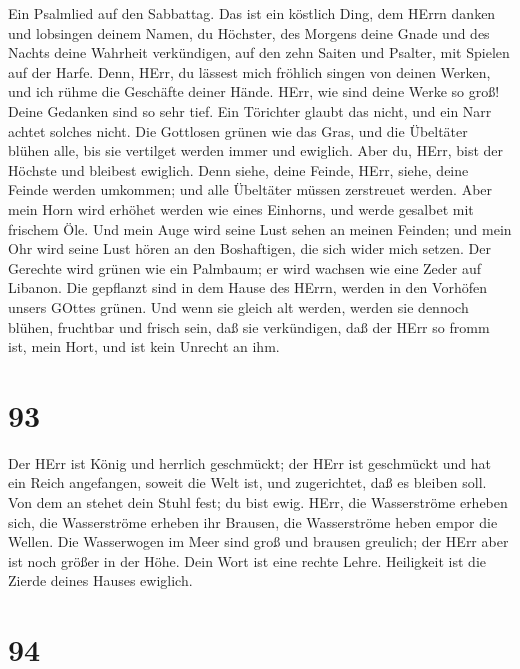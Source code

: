  Ein Psalmlied auf den Sabbattag.  Das ist ein
köstlich Ding, dem HErrn danken und lobsingen deinem Namen, du Höchster,
 des Morgens deine Gnade und des Nachts deine Wahrheit
verkündigen,  auf den zehn Saiten und Psalter, mit Spielen
auf der Harfe.  Denn, HErr, du lässest mich fröhlich singen
von deinen Werken, und ich rühme die Geschäfte deiner Hände.
 HErr, wie sind deine Werke so groß! Deine Gedanken sind so
sehr tief.  Ein Törichter glaubt das nicht, und ein Narr
achtet solches nicht.  Die Gottlosen grünen wie das Gras,
und die Übeltäter blühen alle, bis sie vertilget werden immer und
ewiglich.  Aber du, HErr, bist der Höchste und bleibest
ewiglich.  Denn siehe, deine Feinde, HErr, siehe, deine
Feinde werden umkommen; und alle Übeltäter müssen zerstreuet werden.
 Aber mein Horn wird erhöhet werden wie eines Einhorns, und
werde gesalbet mit frischem Öle.  Und mein Auge wird seine
Lust sehen an meinen Feinden; und mein Ohr wird seine Lust hören an den
Boshaftigen, die sich wider mich setzen.  Der Gerechte wird
grünen wie ein Palmbaum; er wird wachsen wie eine Zeder auf Libanon.
 Die gepflanzt sind in dem Hause des HErrn, werden in den
Vorhöfen unsers GOttes grünen.  Und wenn sie gleich alt
werden, werden sie dennoch blühen, fruchtbar und frisch sein,
 daß sie verkündigen, daß der HErr so fromm ist, mein Hort,
und ist kein Unrecht an ihm.

\hypertarget{section-92}{%
\section{93}\label{section-92}}

 Der HErr ist König und herrlich geschmückt; der HErr ist
geschmückt und hat ein Reich angefangen, soweit die Welt ist, und
zugerichtet, daß es bleiben soll.  Von dem an stehet dein
Stuhl fest; du bist ewig.  HErr, die Wasserströme erheben
sich, die Wasserströme erheben ihr Brausen, die Wasserströme heben empor
die Wellen.  Die Wasserwogen im Meer sind groß und brausen
greulich; der HErr aber ist noch größer in der Höhe.  Dein
Wort ist eine rechte Lehre. Heiligkeit ist die Zierde deines Hauses
ewiglich.

\hypertarget{section-93}{%
\section{94}\label{section-93}}

